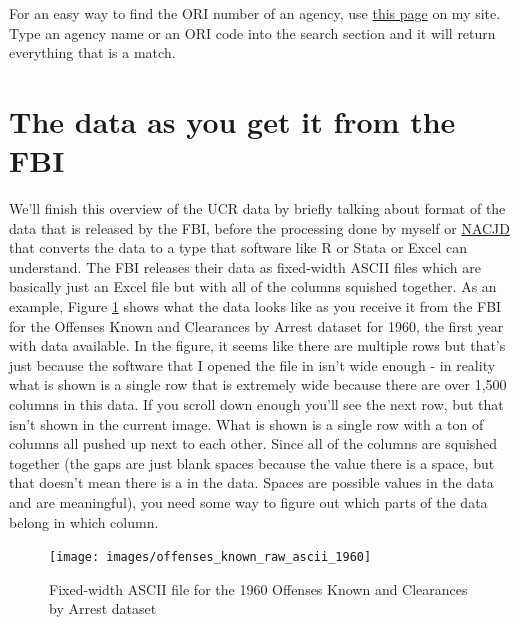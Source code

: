 \documentclass[
  12pt,
  openany]{book}
\begin{document}
For an easy way to find the ORI number of an agency, use \href{https://jacobdkaplan.com/crosswalk.html}{this page} on my site. Type an agency name or an ORI code into the search section and it will return everything that is a match.

\hypertarget{the-data-as-you-get-it-from-the-fbi}{%
\section{The data as you get it from the FBI}\label{the-data-as-you-get-it-from-the-fbi}}

We'll finish this overview of the UCR data by briefly talking about format of the data that is released by the FBI, before the processing done by myself or \href{https://www.icpsr.umich.edu/web/pages/NACJD/index.html}{NACJD} that converts the data to a type that software like R or Stata or Excel can understand. The FBI releases their data as fixed-width ASCII files which are basically just an Excel file but with all of the columns squished together. As an example, Figure \ref{fig:ascii} shows what the data looks like as you receive it from the FBI for the Offenses Known and Clearances by Arrest dataset for 1960, the first year with data available. In the figure, it seems like there are multiple rows but that's just because the software that I opened the file in isn't wide enough - in reality what is shown is a single row that is extremely wide because there are over 1,500 columns in this data. If you scroll down enough you'll see the next row, but that isn't shown in the current image. What is shown is a single row with a ton of columns all pushed up next to each other. Since all of the columns are squished together (the gaps are just blank spaces because the value there is a space, but that doesn't mean there is a in the data. Spaces are possible values in the data and are meaningful), you need some way to figure out which parts of the data belong in which column.

\begin{figure}

{\centering \texttt{[image: images/offenses\_known\_raw\_ascii\_1960]} 

}

\caption{Fixed-width ASCII file for the 1960 Offenses Known and Clearances by Arrest dataset}\label{fig:ascii}
\end{figure}
\end{document}
